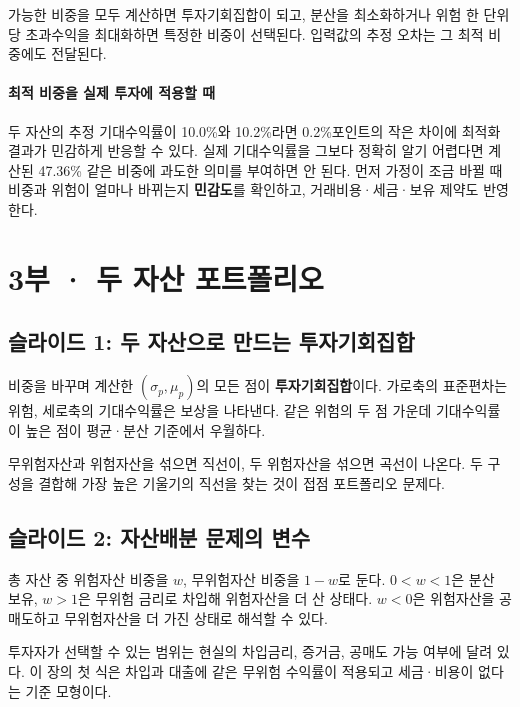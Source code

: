 \documentclass[11pt,a4paper]{article}
\begin{document}
가능한 비중을 모두 계산하면 투자기회집합이 되고, 분산을 최소화하거나 위험 한 단위당 초과수익을 최대화하면 특정한 비중이 선택된다. 입력값의 추정 오차는 그 최적 비중에도 전달된다.
\par

\paragraph{최적 비중을 실제 투자에 적용할 때}

두 자산의 추정 기대수익률이 10.0\%와 10.2\%라면 0.2\%포인트의 작은 차이에 최적화 결과가 민감하게 반응할 수 있다. 실제 기대수익률을 그보다 정확히 알기 어렵다면 계산된 47.36\% 같은 비중에 과도한 의미를 부여하면 안 된다. 먼저 가정이 조금 바뀔 때 비중과 위험이 얼마나 바뀌는지 \textbf{민감도}를 확인하고, 거래비용·세금·보유 제약도 반영한다.
\par

\clearpage

\section{3부 · 두 자산 포트폴리오}

\subsection{슬라이드 1: 두 자산으로 만드는 투자기회집합}

비중을 바꾸며 계산한 $(\sigma_p,\mu_p)$의 모든 점이 \textbf{투자기회집합}이다. 가로축의 표준편차는 위험, 세로축의 기대수익률은 보상을 나타낸다. 같은 위험의 두 점 가운데 기대수익률이 높은 점이 평균·분산 기준에서 우월하다.
\par

무위험자산과 위험자산을 섞으면 직선이, 두 위험자산을 섞으면 곡선이 나온다. 두 구성을 결합해 가장 높은 기울기의 직선을 찾는 것이 접점 포트폴리오 문제다.
\par

\subsection{슬라이드 2: 자산배분 문제의 변수}

총 자산 중 위험자산 비중을 $w$, 무위험자산 비중을 $1-w$로 둔다. $0<w<1$은 분산 보유, $w>1$은 무위험 금리로 차입해 위험자산을 더 산 상태다. $w<0$은 위험자산을 공매도하고 무위험자산을 더 가진 상태로 해석할 수 있다.
\par

투자자가 선택할 수 있는 범위는 현실의 차입금리, 증거금, 공매도 가능 여부에 달려 있다. 이 장의 첫 식은 차입과 대출에 같은 무위험 수익률이 적용되고 세금·비용이 없다는 기준 모형이다.
\par
\end{document}
